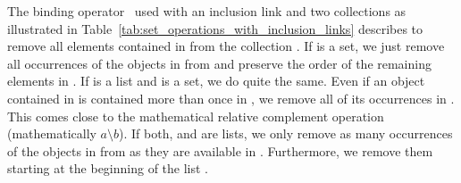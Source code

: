 The binding operator \destroy\ used with an inclusion link and two collections as illustrated in Table~\ref{tab:set_operations_with_inclusion_links}
describes to remove all elements contained in  from the collection .
If  is a set, we just remove all occurrences of the objects in  from  and preserve the order of the remaining elements in .
If  is a list and  is a set, we do quite the same.
Even if an object contained in  is contained more than once in , we remove all of its occurrences in .
This comes close to the mathematical relative complement operation (mathematically $a \setminus b$).
If both,  and  are lists, we only remove as many occurrences of the objects in  from  as they are available in .
Furthermore, we remove them starting at the beginning of the list .


